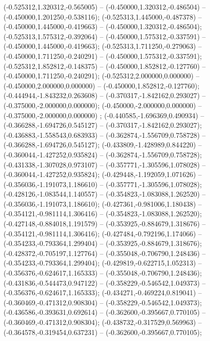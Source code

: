  (-0.525312,1.320312,-0.565005) -- (-0.450000,1.320312,-0.486504) -- (-0.450000,1.201250,-0.538116);
 (-0.525313,1.445000,-0.487378) -- (-0.450000,1.445000,-0.419663) -- (-0.450000,1.320312,-0.486504);
 (-0.525313,1.575312,-0.392064) -- (-0.450000,1.575312,-0.337591) -- (-0.450000,1.445000,-0.419663);
 (-0.525313,1.711250,-0.279063) -- (-0.450000,1.711250,-0.240291) -- (-0.450000,1.575312,-0.337591);
 (-0.525312,1.852812,-0.148375) -- (-0.450000,1.852812,-0.127760) -- (-0.450000,1.711250,-0.240291);
 (-0.525312,2.000000,0.000000) -- (-0.450000,2.000000,0.000000) -- (-0.450000,1.852812,-0.127760);
 (-0.444944,-1.843232,0.263608) -- (-0.370317,-1.842162,0.293027) -- (-0.375000,-2.000000,0.000000);
 (-0.450000,-2.000000,0.000000) -- (-0.375000,-2.000000,0.000000) ;
 (-0.440585,-1.696369,0.490934) -- (-0.366288,-1.694726,0.545127) -- (-0.370317,-1.842162,0.293027);
 (-0.436883,-1.558543,0.683933) -- (-0.362874,-1.556709,0.758728) -- (-0.366288,-1.694726,0.545127);
 (-0.433809,-1.428989,0.844220) -- (-0.360044,-1.427252,0.935824) -- (-0.362874,-1.556709,0.758728);
 (-0.431338,-1.307028,0.973107) -- (-0.357771,-1.305596,1.078028) -- (-0.360044,-1.427252,0.935824);
 (-0.429448,-1.192059,1.071626) -- (-0.356036,-1.191073,1.186610) -- (-0.357771,-1.305596,1.078028);
 (-0.428126,-1.083544,1.140557) -- (-0.354823,-1.083088,1.262520) -- (-0.356036,-1.191073,1.186610);
 (-0.427361,-0.981006,1.180438) -- (-0.354121,-0.981114,1.306416) -- (-0.354823,-1.083088,1.262520);
 (-0.427148,-0.884018,1.191579) -- (-0.353925,-0.884679,1.318676) -- (-0.354121,-0.981114,1.306416);
 (-0.427484,-0.792196,1.174066) -- (-0.354233,-0.793364,1.299404) -- (-0.353925,-0.884679,1.318676);
 (-0.428372,-0.705197,1.127764) -- (-0.355048,-0.706790,1.248436) -- (-0.354233,-0.793364,1.299404);
 (-0.429819,-0.622715,1.052313) -- (-0.356376,-0.624617,1.165333) -- (-0.355048,-0.706790,1.248436);
 (-0.431836,-0.544473,0.947122) -- (-0.358229,-0.546542,1.049373) -- (-0.356376,-0.624617,1.165333);
 (-0.434271,-0.469224,0.819041) -- (-0.360469,-0.471312,0.908304) -- (-0.358229,-0.546542,1.049373);
 (-0.436586,-0.393631,0.692614) -- (-0.362600,-0.395667,0.770105) -- (-0.360469,-0.471312,0.908304);
 (-0.438732,-0.317529,0.569963) -- (-0.364578,-0.319454,0.637231) -- (-0.362600,-0.395667,0.770105);
